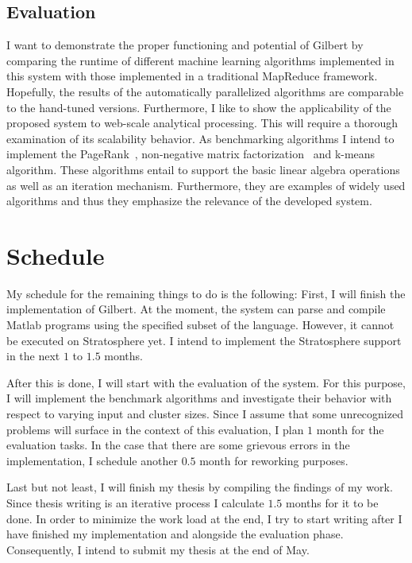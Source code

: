 \documentclass{dima}
\begin{document}
\subsection{Evaluation}

I want to demonstrate the proper functioning and potential of Gilbert by comparing the runtime of different machine learning algorithms implemented in this system with those implemented in a traditional MapReduce framework.
Hopefully, the results of the automatically parallelized algorithms are comparable to the hand-tuned versions.
Furthermore, I like to show the applicability of the proposed system to web-scale analytical processing.
This will require a thorough examination of its scalability behavior.
As benchmarking algorithms I intend to implement the PageRank~\cite{page:1999a}, non-negative matrix factorization~\cite{seung:anips2001a} and k-means~\cite{macqueen:1967a} algorithm.
These algorithms entail to support the basic linear algebra operations as well as an iteration mechanism.
Furthermore, they are examples of widely used algorithms and thus they emphasize the relevance of the developed system.

\section{Schedule}

My schedule for the remaining things to do is the following:
First, I will finish the implementation of Gilbert.
At the moment, the system can parse and compile Matlab programs using the specified subset of the language.
However, it cannot be executed on Stratosphere yet.
I intend to implement the Stratosphere support in the next $1$ to $1.5$ months.

After this is done, I will start with the evaluation of the system.
For this purpose, I will implement the benchmark algorithms and investigate their behavior with respect to varying input and cluster sizes.
Since I assume that some unrecognized problems will surface in the context of this evaluation, I plan $1$ month for the evaluation tasks.
In the case that there are some grievous errors in the implementation, I schedule another $0.5$ month for reworking purposes.

Last but not least, I will finish my thesis by compiling the findings of my work.
Since thesis writing is an iterative process I calculate $1.5$ months for it to be done.
In order to minimize the work load at the end, I try to start writing after I have finished my implementation and alongside the evaluation phase.
Consequently, I intend to submit my thesis at the end of May.
\end{document}
